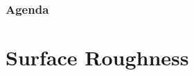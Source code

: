 
\def\PresTitle{Surface Roughness}  %
\def\PresSubtitle{Gauges and Measurement}         %
\def\PresAuthor{Brad Peirson}               %
\def\PresInstitute{College of Information Technology and Engineering}       %
\def\PresDate{}                             %
\def\PresKeywords{}                         %





\maketitle              %

\begin{frame}
    \frametitle{Agenda}
    \begingroup
        \setlength{\parskip}{0.3em} 
        
        
        \setcounter{tocdepth}{1} %
    \tableofcontents
    \setcounter{tocdepth}{2} %
    \endgroup
\end{frame}

\section{Surface Roughness}

